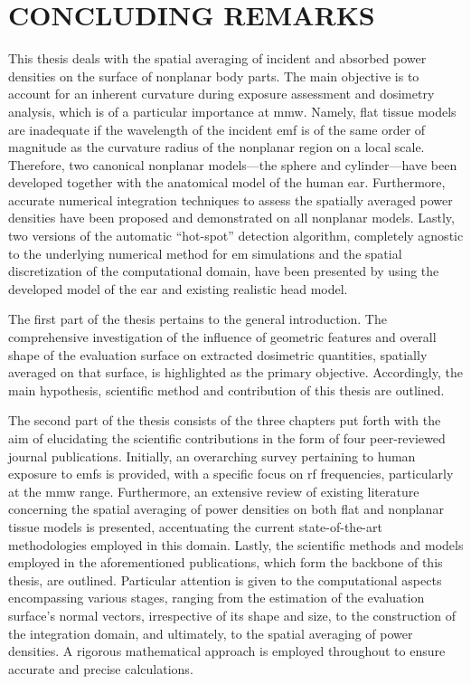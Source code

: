 \cleardoublepage

\chapter{CONCLUDING REMARKS}
\label{chap:6}
This thesis deals with the spatial averaging of incident and absorbed power densities on the surface of nonplanar body parts.
The main objective is to account for an inherent curvature during exposure assessment and dosimetry analysis, which is of a particular importance at \gls{mmw}.
Namely, flat tissue models are inadequate if the wavelength of the incident \gls{emf} is of the same order of magnitude as the curvature radius of the nonplanar region on a local scale.
Therefore, two canonical nonplanar models---the sphere and cylinder---have been developed together with the anatomical model of the human ear.
Furthermore, accurate numerical integration techniques to assess the spatially averaged power densities have been proposed and demonstrated on all nonplanar models.
Lastly, two versions of the automatic ``hot-spot'' detection algorithm, completely agnostic to the underlying numerical method for \gls{em} simulations and the spatial discretization of the computational domain, have been presented by using the developed model of the ear and existing realistic head model.

The first part of the thesis pertains to the general introduction.
The comprehensive investigation of the influence of geometric features and overall shape of the evaluation surface on extracted dosimetric quantities, spatially averaged on that surface, is highlighted as the primary objective.
Accordingly, the main hypothesis, scientific method and contribution of this thesis are outlined.

The second part of the thesis consists of the three chapters put forth with the aim of elucidating the scientific contributions in the form of four peer-reviewed journal publications.
Initially, an overarching survey pertaining to human exposure to \gls{emf}s is provided, with a specific focus on \gls{rf} frequencies, particularly at the \gls{mmw} range.
Furthermore, an extensive review of existing literature concerning the spatial averaging of power densities on both flat and nonplanar tissue models is presented, accentuating the current state-of-the-art methodologies employed in this domain.
Lastly, the scientific methods and models employed in the aforementioned publications, which form the backbone of this thesis, are outlined.
Particular attention is given to the computational aspects encompassing various stages, ranging from the estimation of the evaluation surface's normal vectors, irrespective of its shape and size, to the construction of the integration domain, and ultimately, to the spatial averaging of power densities.
A rigorous mathematical approach is employed throughout to ensure accurate and precise calculations.

